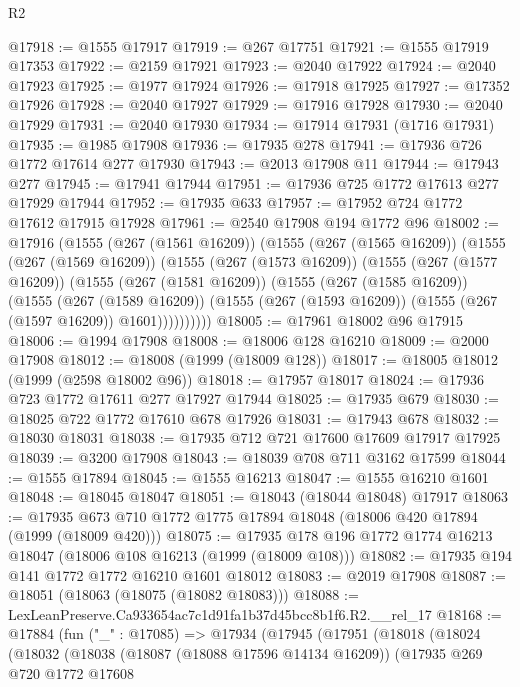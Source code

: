 \begin{lexlean}{R2}
\begin{coremodule}
@17918 := @1555 @17917
@17919 := @267 @17751
@17921 := @1555 @17919 @17353
@17922 := @2159 @17921
@17923 := @2040 @17922
@17924 := @2040 @17923
@17925 := @1977 @17924
@17926 := @17918 @17925
@17927 := @17352 @17926
@17928 := @2040 @17927
@17929 := @17916 @17928
@17930 := @2040 @17929
@17931 := @2040 @17930
@17934 := @17914 @17931 (@1716 @17931)
@17935 := @1985 @17908
@17936 := @17935 @278
@17941 := @17936 @726 @1772 @17614 @277 @17930
@17943 := @2013 @17908 @11
@17944 := @17943 @277
@17945 := @17941 @17944
@17951 := @17936 @725 @1772 @17613 @277 @17929 @17944
@17952 := @17935 @633
@17957 := @17952 @724 @1772 @17612 @17915 @17928
@17961 := @2540 @17908 @194 @1772 @96
@18002 := @17916
    (@1555
      (@267 (@1561 @16209))
      (@1555
        (@267 (@1565 @16209))
        (@1555
          (@267 (@1569 @16209))
          (@1555
            (@267 (@1573 @16209))
            (@1555
              (@267 (@1577 @16209))
              (@1555
                (@267 (@1581 @16209))
                (@1555
                  (@267 (@1585 @16209))
                  (@1555
                    (@267 (@1589 @16209))
                    (@1555 (@267 (@1593 @16209)) (@1555 (@267 (@1597 @16209)) @1601))))))))))
@18005 := @17961 @18002 @96 @17915
@18006 := @1994 @17908
@18008 := @18006 @128 @16210
@18009 := @2000 @17908
@18012 := @18008 (@1999 (@18009 @128))
@18017 := @18005 @18012 (@1999 (@2598 @18002 @96))
@18018 := @17957 @18017
@18024 := @17936 @723 @1772 @17611 @277 @17927 @17944
@18025 := @17935 @679
@18030 := @18025 @722 @1772 @17610 @678 @17926
@18031 := @17943 @678
@18032 := @18030 @18031
@18038 := @17935 @712 @721 @17600 @17609 @17917 @17925
@18039 := @3200 @17908
@18043 := @18039 @708 @711 @3162 @17599
@18044 := @1555 @17894
@18045 := @1555 @16213
@18047 := @1555 @16210 @1601
@18048 := @18045 @18047
@18051 := @18043 (@18044 @18048) @17917
@18063 := @17935 @673 @710 @1772 @1775 @17894 @18048 (@18006 @420 @17894 (@1999 (@18009 @420)))
@18075 := @17935 @178 @196 @1772 @1774 @16213 @18047 (@18006 @108 @16213 (@1999 (@18009 @108)))
@18082 := @17935 @194 @141 @1772 @1772 @16210 @1601 @18012
@18083 := @2019 @17908
@18087 := @18051 (@18063 (@18075 (@18082 @18083)))
@18088 := LexLeanPreserve.Ca933654ac7c1d91fa1b37d45bcc8b1f6.R2.__rel_17
@18168 := @17884
    (fun ("_" : @17085) =>
    @17934
      (@17945
        (@17951
          (@18018
            (@18024
              (@18032
                (@18038
                  (@18087 (@18088 @17596 @14134 @16209))
                  (@17935
                    @269
                    @720
                    @1772
                    @17608

\end{coremodule}
\end{lexlean}
